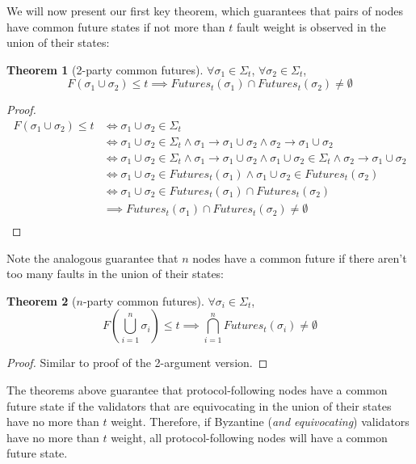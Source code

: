 \documentclass{article}
\theoremstyle{definition}
\newtheorem{thm}{Theorem}
\begin{document}
We will now present our first key theorem, which guarantees that pairs of nodes have common future states if not more than $t$ fault weight is observed in the union of their states:

\begin{thm}[2-party common futures]
$\forall \sigma_1 \in \Sigma_t$, $\forall \sigma_2 \in \Sigma_t$,
$$
F(\sigma_1 \cup \sigma_2) \leq t \implies Futures_t(\sigma_1) \cap Futures_t(\sigma_2) \neq \emptyset
$$
\end{thm}

\begin{proof}
\begin{align}
F(\sigma_1 \cup \sigma_2) \leq t &\iff \sigma_1 \cup \sigma_2 \in \Sigma_t \\
&\iff \sigma_1 \cup \sigma_2 \in \Sigma_t \land\sigma_1 \to \sigma_1 \cup \sigma_2 \land \sigma_2 \to \sigma_1 \cup \sigma_2 \\
&\iff \sigma_1 \cup \sigma_2 \in \Sigma_t  \land \sigma_1 \to \sigma_1  \cup \sigma_2 \land \sigma_1 \cup \sigma_2 \in \Sigma_t  \land \sigma_2 \to \sigma_1 \cup  \sigma_2 \\
&\iff \sigma_1 \cup \sigma_2 \in Futures_t(\sigma_1) \land \sigma_1 \cup \sigma_2 \in Futures_t(\sigma_2) \\
&\iff \sigma_1 \cup \sigma_2 \in Futures_t(\sigma_1) \cap Futures_t(\sigma_2) \\
&\implies Futures_t(\sigma_1) \cap Futures_t(\sigma_2) \neq \emptyset \\
\end{align}
\end{proof}

Note the analogous guarantee that $n$ nodes have a common future if there aren't too many faults in the union of their states:

\begin{thm}[$n$-party common futures]
\label{thm:nparty_bft_common_futures}
$\forall \sigma_i \in \Sigma_t$,
$$
F(\bigcup_{i=1}^n \sigma_i) \leq t \implies \bigcap_{i=1}^n Futures_t(\sigma_i) \neq \emptyset
$$
\end{thm}

\begin{proof}
Similar to proof of the 2-argument version.
\end{proof}

The theorems above guarantee that protocol-following nodes have a common future state if the validators that are equivocating in the union of their states have no more than $t$ weight. Therefore, if Byzantine (\emph{and equivocating}) validators have no more than $t$ weight, all protocol-following nodes will have a common future state.
\end{document}
